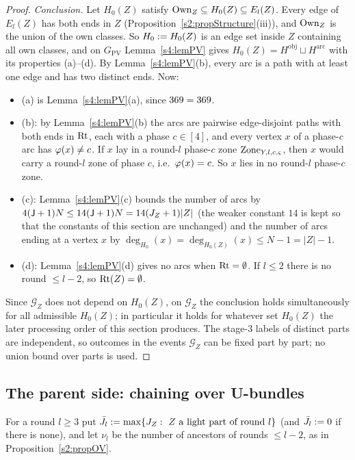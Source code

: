 \begin{proof}
\emph{Conclusion.} Let $H_0(Z)$ satisfy $\mathrm{Own}_Z\subseteq H_0(Z)\subseteq E_l(Z)$. Every edge of $E_l(Z)$ has both ends in $Z$ (Proposition~\ref{s2:propStructure}(iii)), and $\mathrm{Own}_Z$ is the union of the own classes. So $H_0\mathrel{:=} H_0(Z)$ is an edge set inside $Z$ containing all own classes, and on $G_{\mathrm{PV}}$ Lemma~\ref{s4:lemPV} gives $H_0(Z)=H^{\mathrm{obj}}\sqcup H^{\mathrm{arc}}$ with its properties (a)--(d). By Lemma~\ref{s4:lemPV}(b), every arc is a path with at least one edge and has two distinct ends. Now:
\begin{itemize}
\item (a) is Lemma~\ref{s4:lemPV}(a), since $369=369$.
\item (b): by Lemma~\ref{s4:lemPV}(b) the arcs are pairwise edge-disjoint paths with both ends in $\mathrm{Rt}$, each with a phase $c\in[4]$, and every vertex $x$ of a phase-$c$ arc has $\varphi(x)\ne c$. If $x$ lay in a round-$l$ phase-$c$ zone $\mathrm{Zone}_{Y,l,c,\varsigma}$, then $x$ would carry a round-$l$ zone of phase $c$, i.e.\ $\varphi(x)=c$. So $x$ lies in no round-$l$ phase-$c$ zone.
\item (c): Lemma~\ref{s4:lemPV}(c) bounds the number of arcs by $4(\mathsf{J}+1)N\le14(\mathsf{J}+1)N=14(J_Z+1)|Z|$ (the weaker constant $14$ is kept so that the constants of this section are unchanged) and the number of arcs ending at a vertex $x$ by $\deg_{H_0}(x)=\deg_{H_0(Z)}(x)\le N-1=|Z|-1$.
\item (d): Lemma~\ref{s4:lemPV}(d) gives no arcs when $\mathrm{Rt}=\emptyset$. If $l\le2$ there is no round $\le l-2$, so $\mathrm{Rt}(Z)=\emptyset$.
\end{itemize}
Since $\mathcal G_Z$ does not depend on $H_0(Z)$, on $\mathcal G_Z$ the conclusion holds simultaneously for all admissible $H_0(Z)$; in particular it holds for whatever set $H_0(Z)$ the later processing order of this section produces. The stage-3 labels of distinct parts are independent, so outcomes in the events $\mathcal G_Z$ can be fixed part by part; no union bound over parts is used.
\end{proof}

\subsection{The parent side: chaining over U-bundles}

For a round $l\ge3$ put $\bar J_l\mathrel{:=}\max\{J_Z:\ Z\text{ a light part of round }l\}$ (and $\bar J_l\mathrel{:=}0$ if there is none), and let $\nu_l$ be the number of ancestors of rounds $\le l-2$, as in Proposition~\ref{s2:propOV}.

